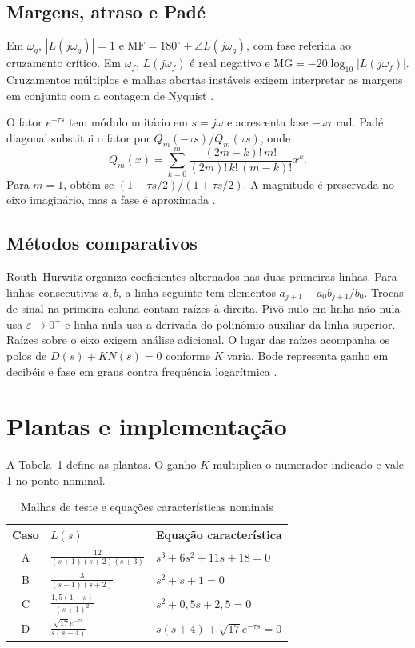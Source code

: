 \documentclass[conference]{IEEEtran}
\begin{document}
\subsection{Margens, atraso e Padé}
Em $\omega_g$, $|L(j\omega_g)|=1$ e $\mathrm{MF}=180^\circ+\angle L(j\omega_g)$, com fase referida ao cruzamento crítico. Em $\omega_f$, $L(j\omega_f)$ é real negativo e $\mathrm{MG}=-20\log_{10}|L(j\omega_f)|$. Cruzamentos múltiplos e malhas abertas instáveis exigem interpretar as margens em conjunto com a contagem de Nyquist \cite{astrom}.

O fator $e^{-\tau s}$ tem módulo unitário em $s=j\omega$ e acrescenta fase $-\omega\tau$ rad. Padé diagonal substitui o fator por $Q_m(-\tau s)/Q_m(\tau s)$, onde
\begin{equation}
 Q_m(x)=\sum_{k=0}^{m}\frac{(2m-k)!\,m!}{(2m)!\,k!\,(m-k)!}x^k .
\end{equation}
Para $m=1$, obtém-se $(1-\tau s/2)/(1+\tau s/2)$. A magnitude é preservada no eixo imaginário, mas a fase é aproximada \cite{pade}.

\subsection{Métodos comparativos}
Routh--Hurwitz organiza coeficientes alternados nas duas primeiras linhas. Para linhas consecutivas $a,b$, a linha seguinte tem elementos $a_{j+1}-a_0b_{j+1}/b_0$. Trocas de sinal na primeira coluna contam raízes à direita. Pivô nulo em linha não nula usa $\varepsilon\to0^+$ e linha nula usa a derivada do polinômio auxiliar da linha superior. Raízes sobre o eixo exigem análise adicional. O lugar das raízes acompanha os polos de $D(s)+KN(s)=0$ conforme $K$ varia. Bode representa ganho em decibéis e fase em graus contra frequência logarítmica \cite{astrom,ogata}.

\section{Plantas e implementação}
A Tabela~\ref{tab:modelos} define as plantas. O ganho $K$ multiplica o numerador indicado e vale 1 no ponto nominal.
\begin{table}[htbp]
\caption{Malhas de teste e equações características nominais}
\label{tab:modelos}
\centering\small
\begin{tabular}{@{}cll@{}}
\toprule
Caso & $L(s)$ & Equação característica\\
\midrule
A & $\frac{12}{(s+1)(s+2)(s+3)}$ & $s^3+6s^2+11s+18=0$\\[4pt]
B & $\frac{3}{(s-1)(s+2)}$ & $s^2+s+1=0$\\[4pt]
C & $\frac{1{,}5(1-s)}{(s+1)^2}$ & $s^2+0{,}5s+2{,}5=0$\\[4pt]
D & $\frac{\sqrt{17}e^{-\tau s}}{s(s+4)}$ & $s(s+4)+\sqrt{17}e^{-\tau s}=0$\\
\bottomrule
\end{tabular}
\end{table}
\end{document}
